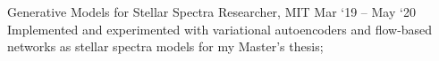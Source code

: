 \experience
    {Generative Models for Stellar Spectra}
    {Researcher, MIT}
    {Mar `19 -- May `20}
    {
        Implemented and experimented with variational autoencoders and flow-based networks as
        stellar spectra models for my Master's thesis;
    }
